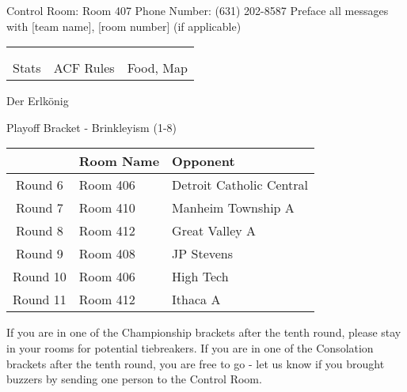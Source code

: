 \documentclass{article}%
\begin{document}
\newline%
Control Room: Room 407\newline%
Phone Number: (631) 202{-}8587\newline%
Preface all messages with {[}team name{]}, {[}room number{]} (if applicable)%
\vspace*{30pt}%
\newline%
%
\begin{tabularx}{\textwidth}{YYY}%
  &  &  \\%
\\%
Stats&ACF Rules&Food, Map\\%
\end{tabularx}%
\newpage%
\begin{center}%
\begin{Huge}%
Der Erlkönig%
\end{Huge}%
\vspace*{12pt}%
\linebreak%
\begin{Large}%
Playoff Bracket {-} Brinkleyism (1{-}8)%
\end{Large}%
\end{center}%
\vspace*{4pt}%
%
\begin{tabularx}{\textwidth}{|c|Y|Y|}%
\hline%
&Room Name&Opponent\\%
\hline%
Round 6&Room 406&Detroit Catholic Central\\%
Round 7&Room 410&Manheim Township A\\%
Round 8&Room 412&Great Valley A\\%
Round 9&Room 408&JP Stevens\\%
Round 10&Room 406&High Tech\\%
Round 11&Room 412&Ithaca A\\%
\hline%
\end{tabularx}%
\vspace*{30pt}%
\linebreak%
If you are in one of the Championship brackets after the tenth round, please stay in your rooms for potential tiebreakers.\newline%
\newline%
If you are in one of the Consolation brackets after the tenth round, you are free to go {-} let us know if you brought buzzers by sending one person to the Control Room.\newline%
\end{document}
